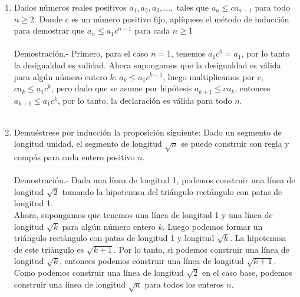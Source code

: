 \begin{enumerate}
\item Dados números reales positivos $a_1,a_2,a_3,...,$ tales que $a_n\leq ca_{a-1}$ para todo $n\geq 2$. Donde $c$ es un número positivo fijo, aplíquese el método de inducción para demostrar que $a_n \leq a_1 c^{n-1}$ para cada $n \geq 1$\\\\
Demostración.- \; Primero, para el caso $n=1$, tenemos $a_1c^0=a_1$, por lo tanto la desigualdad es validad. Ahora supongamos que la desigualdad es válida para algún número entero $k$: $a_k\leq a_1c^{k-1}$, luego multiplicamos por $c$, $ca_k\leq a_1c^k$, pero dado que se asume por hipótesis $a_{k+1} \leq ca_k$, entonces $a_{k+1}\leq a_1c^k$, por lo tanto, la declaración es válida para todo $n$.\\\\

\item Demuéstrese por inducción la proposición siguiente: Dado un segmento de longitud unidad, el segmento de longitud $\sqrt{n}$ se puede construir con regla y compás para cada entero positivo $n$.\\\\
Demostración.- \; Dada una línea de longitud 1, podemos construir una línea de longitud $\sqrt{2}$ tomando la hipotenusa del triángulo rectángulo con patas de longitud 1.\\
Ahora, supongamos que tenemos una línea de longitud 1 y una línea de longitud $\sqrt{k}$ para algún número entero $k$. Luego podemos formar un triángulo rectángulo con patas de longitud 1 y longitud $\sqrt{k}$. La hipotenusa de este triángulo es $\sqrt{k+1}$. Por lo tanto, si podemos construir una línea de longitud $\sqrt{k}$, entonces podemos construir una línea de longitud $\sqrt{k+1}$. Como podemos construir una línea de longitud $\sqrt{2}$ en el caso base, podemos construir una línea de longitud $\sqrt{n}$ para todos los enteros $n$.\\\\


\end{enumerate}

